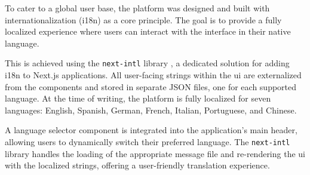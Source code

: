To cater to a global user base, the platform was designed and built with internationalization (i18n) as a core principle. The goal is to provide a fully localized experience where users can interact with the interface in their native language.

This is achieved using the \texttt{next-intl} library \cite{NEXT-INTL}, a dedicated solution for adding i18n to Next.js applications. All user-facing strings within the \acs{ui} are externalized from the components and stored in separate JSON files, one for each supported language. At the time of writing, the platform is fully localized for seven languages: English, Spanish, German, French, Italian, Portuguese, and Chinese.

A language selector component is integrated into the application's main header, allowing users to dynamically switch their preferred language. The \texttt{next-intl} library handles the loading of the appropriate message file and re-rendering the \acs{ui} with the localized strings, offering a user-friendly translation experience.